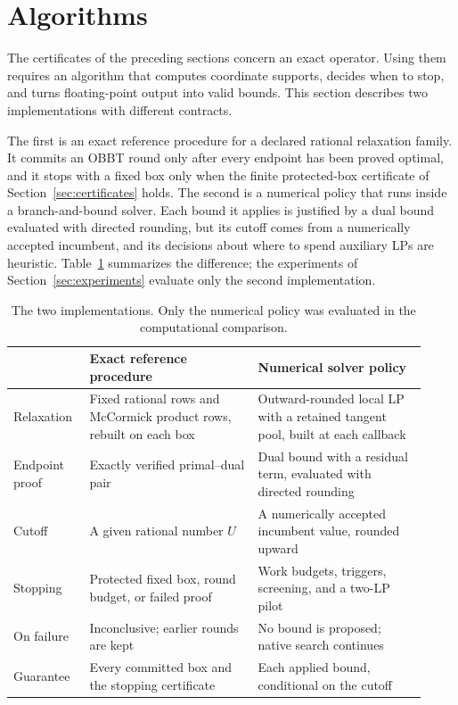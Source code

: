 \section{Algorithms}\label{sec:algorithms}

The certificates of the preceding sections concern an exact operator. Using
them requires an algorithm that computes coordinate supports, decides when to
stop, and turns floating-point output into valid bounds.
This section describes two implementations with different contracts.

The first is an exact reference procedure for a declared rational relaxation
family. It commits an OBBT round only after every endpoint has been proved
optimal, and it stops with a fixed box only when the finite protected-box
certificate of Section~\ref{sec:certificates} holds. The second is a numerical
policy that runs inside a branch-and-bound solver. Each bound it applies is
justified by a dual bound evaluated with directed rounding, but its cutoff
comes from a numerically accepted incumbent, and its decisions about where to
spend auxiliary LPs are heuristic. Table~\ref{tab:contracts} summarizes the
difference; the
experiments of Section~\ref{sec:experiments} evaluate only the second
implementation.

\begin{table}[htbp]
\centering
\small
\begin{tabular}{@{}p{0.16\linewidth}p{0.38\linewidth}p{0.38\linewidth}@{}}
\toprule
& \raggedright Exact reference procedure
& \raggedright Numerical solver policy\tabularnewline
\midrule
\raggedright Relaxation
& \raggedright Fixed rational rows and McCormick product rows, rebuilt on each box
& \raggedright Outward-rounded local LP with a retained tangent pool, built at each callback\tabularnewline
\raggedright Endpoint proof
& \raggedright Exactly verified primal--dual pair
& \raggedright Dual bound with a residual term, evaluated with directed rounding\tabularnewline
\raggedright Cutoff
& \raggedright A given rational number $U$
& \raggedright A numerically accepted incumbent value, rounded upward\tabularnewline
\raggedright Stopping
& \raggedright Protected fixed box, round budget, or failed proof
& \raggedright Work budgets, triggers, screening, and a two-LP pilot\tabularnewline
\raggedright On failure
& \raggedright Inconclusive; earlier rounds are kept
& \raggedright No bound is proposed; native search continues\tabularnewline
\raggedright Guarantee
& \raggedright Every committed box and the stopping certificate
& \raggedright Each applied bound, conditional on the cutoff\tabularnewline
\bottomrule
\end{tabular}
\caption{The two implementations. Only the numerical policy was evaluated
in the computational comparison.}
\label{tab:contracts}
\end{table}

